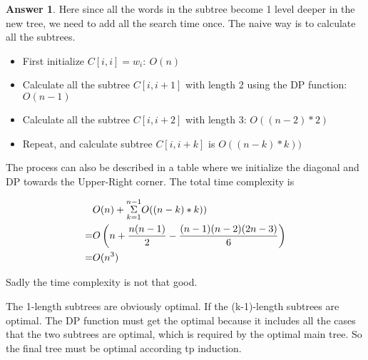\documentclass{article}
\theoremstyle{definition}
\newtheorem{ans}{Answer}
\begin{document}
\begin{ans}
		Here since all the words in the subtree become 1 level deeper in the new tree, we need to add all the search time once. The naive way is to calculate all the subtrees.
		
		\begin{itemize}
			\item First initialize $C[i, i]=w_i:~O(n)$
			\item Calculate all the subtree $C[i, i+1]$ with length 2 using the DP function: $O(n-1)$
			\item Calculate all the subtree $C[i, i+2]$ with length 3: $O((n-2)*2)$
			\item Repeat, and calculate subtree $C[i, i+k]$ is $O((n-k)*k))$
		\end{itemize} 
		
		The process can also be described in a table where we initialize the diagonal and DP towards the Upper-Right corner. The total time complexity is
		 
		$$
		\begin{aligned}
			  & O(n)+\overunderset{n-1}{k=1}{\Sigma}O((n-k)*k))\\
			= & O\left(n+\frac{n(n-1)}{2}-\frac{(n-1)(n-2)(2n-3)}{6}\right)\\
			= & O(n^3)
		\end{aligned}
		$$
		
		Sadly the time complexity is not that good.
		
		The 1-length subtrees are obviously optimal. If the (k-1)-length subtrees are optimal. The DP function must get the optimal because it includes all the cases that the two subtrees are optimal, which is required by the optimal main tree. So the final tree must be optimal according tp induction.
	\end{ans}
\end{document}
